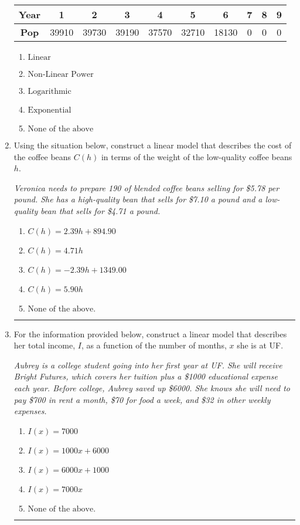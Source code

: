 \documentclass[14pt]{extbook}
\newcommand{\litem}[1]{\item#1\hspace*{-1cm}\rule{\textwidth}{0.4pt}}
\begin{document}
\begin{enumerate}
{\begin{tabular}{c|c|c|c|c|c|c|c|c|c}
\textbf{Year} &1 &2 &3 &4 &5 &6 &7 &8 &9\tabularnewline \hline
\textbf{Pop} &39910 &39730 &39190 &37570 &32710 &18130 &0 &0 &0\end{tabular}\begin{enumerate}[label=\Alph*.]
\item \( \text{Linear} \)
\item \( \text{Non-Linear Power} \)
\item \( \text{Logarithmic} \)
\item \( \text{Exponential} \)
\item \( \text{None of the above} \)

\end{enumerate} }
\litem{
Using the situation below, construct a linear model that describes the cost of the coffee beans $C(h)$ in terms of the weight of the low-quality coffee beans $h$.
\begin{center}
    \textit{ Veronica needs to prepare 190 of blended coffee beans selling for \$5.78 per pound. She has a high-quality bean that sells for \$7.10 a pound and a low-quality bean that sells for \$4.71 a pound. }
\end{center}
\begin{enumerate}[label=\Alph*.]
\item \( C(h) = 2.39 h + 894.90 \)
\item \( C(h) = 4.71 h \)
\item \( C(h) = -2.39 h + 1349.00 \)
\item \( C(h) = 5.90 h \)
\item \( \text{None of the above.} \)

\end{enumerate} }
\litem{
For the information provided below, construct a linear model that describes her total income, $I$, as a function of the number of months, $x$ she is at UF.
\begin{center}
    \textit{ Aubrey is a college student going into her first year at UF. She will receive Bright Futures, which covers her tuition plus a \$1000 educational expense each year. Before college, Aubrey saved up \$6000. She knows she will need to pay \$700 in rent a month, \$70 for food a week, and \$32 in other weekly expenses. }
\end{center}
\begin{enumerate}[label=\Alph*.]
\item \( I(x) = 7000 \)
\item \( I(x) = 1000 x + 6000 \)
\item \( I(x) = 6000 x + 1000 \)
\item \( I(x) = 7000 x \)
\item \( \text{None of the above.} \)


\end{enumerate}}
\end{enumerate}
\end{document}
